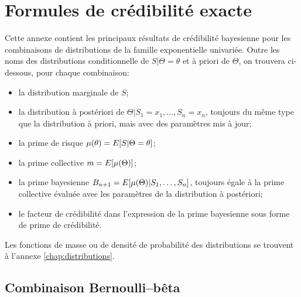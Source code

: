 \chapter{Formules de crédibilité exacte}
\label{chap:formules}

Cette annexe contient les principaux résultats de crédibilité
bayesienne pour les combinaisons de distributions de la famille
exponentielle univariée. Outre les noms des distributions
conditionnelle de $S|\Theta = \theta$ et à priori de $\Theta$, on
trouvera ci-dessous, pour chaque combinaison:
\begin{itemize}
\item la distribution marginale de $S$;
\item la distribution à postériori de
  $\Theta|S_1 = x_1, \dots, S_n = x_n$, toujours du même type que la
  distribution à priori, mais avec des paramètres mis à jour;
\item la prime de risque $\mu(\theta) = E [ S|\Theta = \theta ]$;
\item la prime collective $m = E [ \mu(\Theta) ]$;
\item la prime bayesienne
  $B_{n+1} = E [ \mu(\Theta)|S_1, \dots, S_n ]$, toujours égale à la
  prime collective évaluée avec les paramètres de la distribution à
  postériori;
\item le facteur de crédibilité dans l'expression de la prime
  bayesienne sous forme de prime de crédibilité.
\end{itemize}

Les fonctions de masse ou de densité de probabilité des distributions
se trouvent à l'annexe \ref{chap:distributions}.


\begingroup
{}

\section{Combinaison Bernoulli--bêta}

